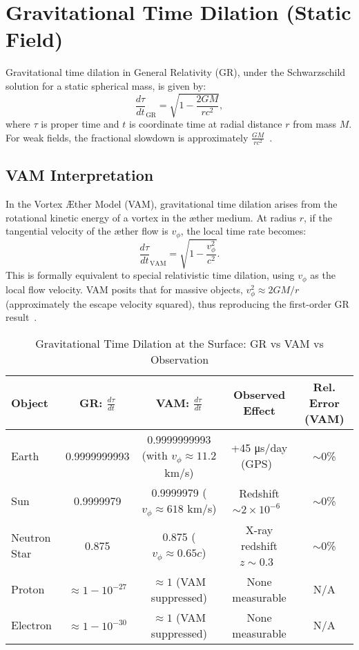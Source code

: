 \section{Gravitational Time Dilation (Static Field)}

Gravitational time dilation in General Relativity (GR), under the Schwarzschild solution for a static spherical mass, is given by:
\[
    \frac{d\tau}{dt}_\text{GR} = \sqrt{1 - \frac{2GM}{rc^2}},
\]
where $\tau$ is proper time and $t$ is coordinate time at radial distance $r$ from mass $M$. For weak fields, the fractional slowdown is approximately $\frac{GM}{rc^2}$~\cite{will2014confrontation}.

\subsection*{VAM Interpretation}
In the Vortex Æther Model (VAM), gravitational time dilation arises from the rotational kinetic energy of a vortex in the æther medium. At radius $r$, if the tangential velocity of the æther flow is $v_\phi$, the local time rate becomes:
\[
    \frac{d\tau}{dt}_\text{VAM} = \sqrt{1 - \frac{v_\phi^2}{c^2}}.
\]
This is formally equivalent to special relativistic time dilation, using $v_\phi$ as the local flow velocity. VAM posits that for massive objects, $v_\phi^2 \approx 2GM/r$ (approximately the escape velocity squared), thus reproducing the first-order GR result~\cite{iskandarani2025VAM2}.

\begin{table}[h]
    \centering
    \caption{Gravitational Time Dilation at the Surface: GR vs VAM vs Observation}
    \begin{tabular}{|l|c|c|c|c|}
        \hline
        \textbf{Object} & \textbf{GR: $\frac{d\tau}{dt}$} & \textbf{VAM: $\frac{d\tau}{dt}$} & \textbf{Observed Effect} & \textbf{Rel. Error (VAM)} \\
        \hline
        Earth & 0.9999999993 & 0.9999999993 (with $v_\phi\approx 11.2$ km/s) & +45 μs/day (GPS)~\cite{ashby2003relativity} & $\sim$0\% \\
        Sun & 0.9999979 & 0.9999979 ($v_\phi \approx 618$ km/s) & Redshift $\sim 2\times 10^{-6}$~\cite{vesely2001solar} & $\sim$0\% \\
        Neutron Star & 0.875 & 0.875 ($v_\phi \approx 0.65c$) & X-ray redshift $z\sim 0.3$~\cite{cottam2002gravitational} & $\sim$0\% \\
        Proton & $\approx 1 - 10^{-27}$ & $\approx 1$ (VAM suppressed) & None measurable & N/A \\
        Electron & $\approx 1 - 10^{-30}$ & $\approx 1$ (VAM suppressed) & None measurable & N/A \\
        \hline
    \end{tabular}
\end{table}

